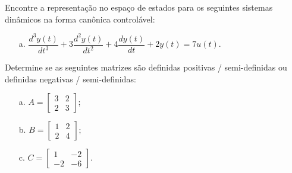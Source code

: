 \begin{question}
  Encontre a representação no espaço de estados para os seguintes sistemas dinâmicos na forma canônica controlável:
  \begin{itemize}
    \item[a.] $\dfrac{d^3 y(t)}{dt^3} + 3 \dfrac{d^2 y(t)}{dt^2} + 4 \dfrac{dy(t)}{dt} + 2y(t) = 7u(t)$.
  \end{itemize}
\end{question}

\begin{resolution}

\end{resolution}


\begin{question}
  Determine se as seguintes matrizes são definidas positivas / semi-definidas ou definidas negativas / semi-definidas:
  \begin{multicols}{3}
    \begin{itemize}
      \item[a.] $A = \begin{bmatrix} 3 & 2 \\ 2 & 3 \end{bmatrix}$;
      \item[b.] $B = \begin{bmatrix} 1 & 2 \\ 2 & 4 \end{bmatrix}$;
      \item[c.] $C = \begin{bmatrix} 1 & -2 \\ -2 & -6 \end{bmatrix}$.
    \end{itemize}
  \end{multicols}
  \vspace{8pt}
\end{question}

\begin{resolution}

\end{resolution}


